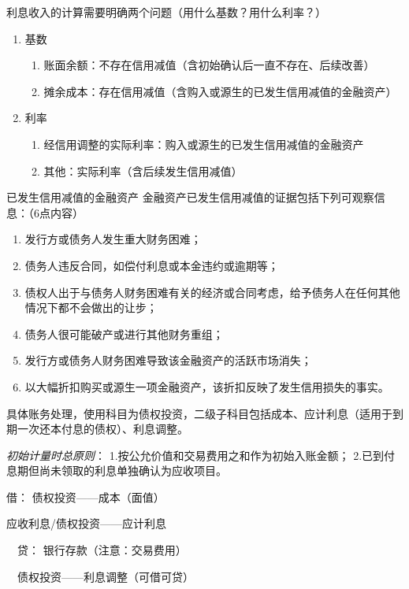 \documentclass[UTF8,12pt]{ctexart}
\newenvironment{Dr}{\noindent 借：}{\par}
\newenvironment{Cr}{\noindent \ \ 贷：}{\par}
\numberwithin{equation}{section} %
\numberwithin{figure}{section}
\numberwithin{table}{section}
\begin{document}
	利息收入的计算需要明确两个问题（用什么基数？用什么利率？）
	\begin{enumerate}
		\item 基数
		\begin{enumerate}
			\item 账面余额：不存在信用减值（含初始确认后一直不存在、后续改善）
			
			\item 摊余成本：存在信用减值（含购入或源生的已发生信用减值的金融资产）
		\end{enumerate}
		
		\item 利率
		\begin{enumerate}
			\item 经信用调整的实际利率：购入或源生的已发生信用减值的金融资产
			
			\item 其他：实际利率（含后续发生信用减值）
		\end{enumerate}
	\end{enumerate}

	已发生信用减值的金融资产
	金融资产已发生信用减值的证据包括下列可观察信息：（6点内容）
	\begin{enumerate}
		\item 发行方或债务人发生重大财务困难；
		
		\item 债务人违反合同，如偿付利息或本金违约或逾期等；
		
		\item 债权人出于与债务人财务困难有关的经济或合同考虑，给予债务人在任何其他情况下都不会做出的让步；
		
		\item 债务人很可能破产或进行其他财务重组；
		
		\item 发行方或债务人财务困难导致该金融资产的活跃市场消失；
		
		\item 以大幅折扣购买或源生一项金融资产，该折扣反映了发生信用损失的事实。
	\end{enumerate}
	
	具体账务处理，使用科目为债权投资，二级子科目包括成本、应计利息（适用于到期一次还本付息的债权）、利息调整。
	
	\textit{初始计量时总原则}：
	1.按公允价值和交易费用之和作为初始入账金额；
	2.已到付息期但尚未领取的利息单独确认为应收项目。
	
	\begin{Dr}
		债权投资——成本（面值）
		
		应收利息/债权投资——应计利息
	\end{Dr}
	\begin{Cr}
		银行存款（注意：交易费用）
		
		\ \ 债权投资——利息调整（可借可贷）
	\end{Cr}
	
\end{document}
